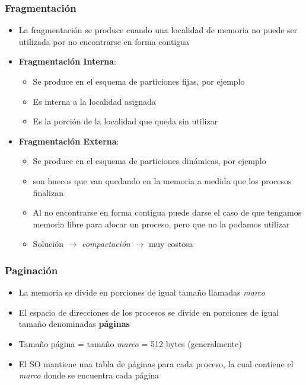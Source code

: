 \begin{frame}
  \frametitle{\textbf{Fragmentación}}
  \begin{itemize}
  	  \item La fragmentación se produce cuando una localidad de memoria no puede ser utilizada por no encontrarse en forma contigua
	  \item \textbf{Fragmentación Interna}:
	  \begin{itemize}
	  	\item Se produce en el esquema de particiones fijas, por ejemplo
	  	\item Es interna a la localidad asignada
	  	\item Es la porción de la localidad que queda sin utilizar
	  \end{itemize}
	  \item \textbf{Fragmentación Externa}:
	  \begin{itemize}
	  	\item Se produce en el esquema de particiones dinámicas, por ejemplo
	  	\item son huecos que van quedando en la memoria a medida que los procesos finalizan
	  	\item Al no encontrarse en forma contigua puede darse el caso de que tengamos memoria libre para alocar un proceso, pero que no la podamos utilizar
	  	\item Solución $\rightarrow$ \emph{compactación} $\rightarrow$ muy costosa
	  \end{itemize}
  \end{itemize}
\end{frame}

\begin{frame}
  \frametitle{\textbf{Paginación}}
  \begin{itemize}
  	  \item La memoria se divide en porciones de igual tamaño llamadas \emph{\emph{marco}}
	  \item El espacio de direcciones de los procesos se divide en porciones de igual tamaño denominadas \textbf{páginas}
	  \item Tamaño página = tamaño \emph{marco} = 512 bytes (generalmente)
	  \item El SO mantiene una tabla de páginas para cada proceso, la cual contiene el \emph{marco} donde se encuentra cada página
  \end{itemize}
\end{frame}


